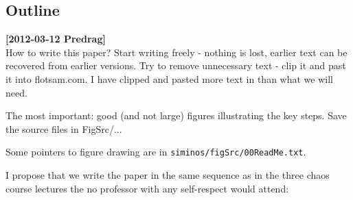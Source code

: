 

\subsection{Outline}
\label{chap:outline}

\noindent
{\bf [2012-03-12 Predrag]}
\\
How to write this paper? Start writing freely - nothing is lost, earlier text can be recovered
from earlier versions. Try to remove unnecessary text - clip  it and past it into flotsam.com.
I have clipped and pasted more text in than what we will need.

The most important: good (and not large) figures illustrating the key steps. Save the source files
in FigSrc/...

Some pointers to figure drawing are in \texttt{siminos/figSrc/00ReadMe.txt}.

I propose that we write the
paper in the same sequence as in the three chaos course lectures
the no professor with any self-respect would attend:

